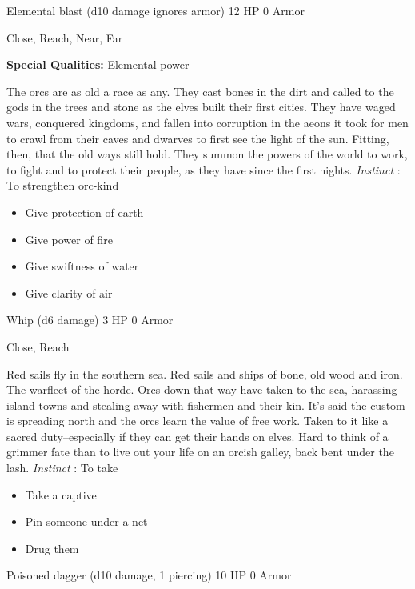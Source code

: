 

 Elemental blast (d10 damage ignores armor) 12 HP 0 Armor


 Close, Reach, Near, Far


 \textbf{Special Qualities:}
 Elemental power


 The orcs are as old a race as any. They cast bones in the dirt and called to the gods in the trees and stone as the elves built their first cities. They have waged wars, conquered kingdoms, and fallen into corruption in the aeons it took for men to crawl from their caves and dwarves to first see the light of the sun. Fitting, then, that the old ways still hold. They summon the powers of the world to work, to fight and to protect their people, as they have since the first nights. \emph{Instinct}
: To strengthen orc-kind
\begin{itemize}
\item Give protection of earth
\item Give power of fire
\item Give swiftness of water
\item Give clarity of air

\end{itemize}




 Whip (d6 damage) 3 HP 0 Armor


 Close, Reach


 Red sails fly in the southern sea. Red sails and ships of bone, old wood and iron. The warfleet of the horde. Orcs down that way have taken to the sea, harassing island towns and stealing away with fishermen and their kin. It's said the custom is spreading north and the orcs learn the value of free work. Taken to it like a sacred duty--especially if they can get their hands on elves. Hard to think of a grimmer fate than to live out your life on an orcish galley, back bent under the lash. \emph{Instinct}
: To take
\begin{itemize}
\item Take a captive
\item Pin someone under a net
\item Drug them

\end{itemize}




 Poisoned dagger (d10 damage, 1 piercing) 10 HP 0 Armor


